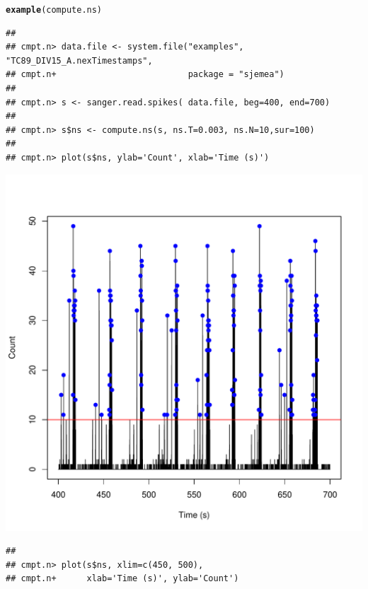 \documentclass{article}\usepackage[]{graphicx}\usepackage[]{color}
\makeatletter
\def\maxwidth{ %
  \ifdim\Gin@nat@width>\linewidth
    \linewidth
  \else
    \Gin@nat@width
  \fi
}
\newcommand{\hlkwd}[1]{\textcolor[rgb]{0.737,0.353,0.396}{\textbf{#1}}}%
\newenvironment{kframe}{%
 \def\at@end@of@kframe{}%
 \ifinner\ifhmode%
  \def\at@end@of@kframe{\end{minipage}}%
  \begin{minipage}{\columnwidth}%
 \fi\fi%
 \def\FrameCommand##1{\hskip\@totalleftmargin \hskip-\fboxsep
 \colorbox{shadecolor}{##1}\hskip-\fboxsep
     \hskip-\linewidth \hskip-\@totalleftmargin \hskip\columnwidth}%
 \MakeFramed {\advance\hsize-\width
   \@totalleftmargin\z@ \linewidth\hsize
   \@setminipage}}%
 {\par\unskip\endMakeFramed%
 \at@end@of@kframe}
\newenvironment{knitrout}{}{} %
\makeatother
\begin{document}
\begin{knitrout}
\color{fgcolor}\begin{kframe}
\begin{alltt}
\hlkwd{example}(compute.ns)
\end{alltt}
\begin{verbatim}
## 
## cmpt.n> data.file <- system.file("examples", "TC89_DIV15_A.nexTimestamps",
## cmpt.n+                          package = "sjemea")
## 
## cmpt.n> s <- sanger.read.spikes( data.file, beg=400, end=700)
## 
## cmpt.n> s$ns <- compute.ns(s, ns.T=0.003, ns.N=10,sur=100)
## 
## cmpt.n> plot(s$ns, ylab='Count', xlab='Time (s)')
\end{verbatim}
\end{kframe}
\includegraphics[width=\maxwidth]{figure/unnamed-chunk-21} 
\begin{kframe}\begin{verbatim}
## 
## cmpt.n> plot(s$ns, xlim=c(450, 500),
## cmpt.n+      xlab='Time (s)', ylab='Count')
\end{verbatim}
\end{kframe}

\end{knitrout}
\end{document}
